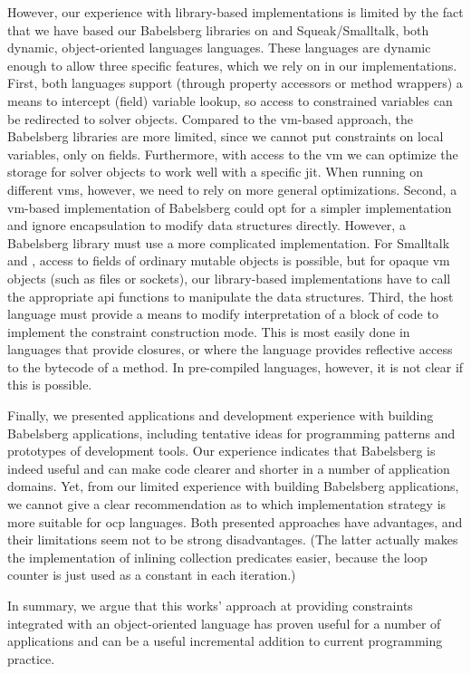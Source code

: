 However, our experience with library-based implementations is limited by the
fact that we have based our Babelsberg libraries on \javascript and
Squeak/Smalltalk, both dynamic, object-oriented languages languages. These
languages are dynamic enough to allow three specific features, which we rely on
in our implementations. First, both languages support (through property
accessors or method wrappers) a means to intercept (field) variable lookup, so
access to constrained variables can be redirected to solver objects. Compared to
the \ac{vm}-based approach, the Babelsberg libraries are more limited, since we
cannot put constraints on local variables, only on fields. Furthermore, with
access to the \ac{vm} we can optimize the storage for solver objects to work
well with a specific \ac{jit}. When running on different \acp{vm}, however, we
need to rely on more general optimizations. Second, a \ac{vm}-based
implementation of Babelsberg could opt for a simpler implementation and ignore
encapsulation to modify data structures directly. However, a Babelsberg library
must use a more complicated implementation. For Smalltalk and \javascript,
access to fields of ordinary mutable objects is possible, but for opaque \ac{vm}
objects (such as files or sockets), our library-based implementations have to
call the appropriate \ac{api} functions to manipulate the data
structures. Third, the host language must provide a means to modify
interpretation of a block of code to implement the constraint construction
mode. This is most easily done in languages that provide closures, or where the
language provides reflective access to the bytecode of a method. In pre-compiled
languages, however, it is not clear if this is possible.

Finally, we presented applications and development experience with building
Babelsberg applications, including tentative ideas for programming patterns and
prototypes of development tools. Our experience indicates that Babelsberg is
indeed useful and can make code clearer and shorter in a number of application
domains. Yet, from our limited experience with building Babelsberg applications,
we cannot give a clear recommendation as to which implementation strategy is
more suitable for \ac{ocp} languages. Both presented approaches have advantages,
and their limitations seem not to be strong disadvantages. (The latter actually
makes the implementation of inlining collection predicates easier, because the
loop counter is just used as a constant in each iteration.)

In summary, we argue that this works' approach at providing constraints
integrated with an object-oriented language has proven useful for a number of
applications and can be a useful incremental addition to current programming
practice.


